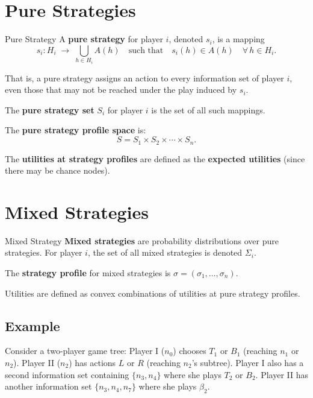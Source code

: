 \documentclass[12pt, a4paper]{article}
\begin{document}
\section{Pure Strategies}

\begin{defbox}{Pure Strategy}
A \textbf{pure strategy} for player $i$, denoted $s_i$, is a mapping
\[
  s_i : H_i \;\longrightarrow\; \bigcup_{h \in H_i} A(h)
  \quad \text{such that} \quad
  s_i(h) \in A(h) \quad \forall\, h \in H_i.
\]
\end{defbox}

That is, a pure strategy assigns an action to every information set of player $i$, even those that may not be reached under the play induced by $s_i$.

The \textbf{pure strategy set} $S_i$ for player $i$ is the set of all such mappings.

The \textbf{pure strategy profile space} is:
\[
  S = S_1 \times S_2 \times \cdots \times S_n.
\]

The \textbf{utilities at strategy profiles} are defined as the \textbf{expected utilities} (since there may be chance nodes).

\section{Mixed Strategies}

\begin{defbox}{Mixed Strategy}
\textbf{Mixed strategies} are probability distributions over pure strategies. For player $i$, the set of all mixed strategies is denoted $\Sigma_i$.
\end{defbox}

The \textbf{strategy profile} for mixed strategies is $\sigma = (\sigma_1, \ldots, \sigma_n)$.

\begin{notebox}
Utilities are defined as convex combinations of utilities at pure strategy profiles.
\end{notebox}

\subsection{Example}

Consider a two-player game tree: Player I ($n_0$) chooses $T_1$ or $B_1$ (reaching $n_1$ or $n_2$). Player II ($n_2$) has actions $L$ or $R$ (reaching $n_2$'s subtree). Player I also has a second information set containing $\{n_3, n_4\}$ where she plays $T_2$ or $B_2$. Player II has another information set $\{n_3, n_4, n_7\}$ where she plays $\beta_2$.
\end{document}
